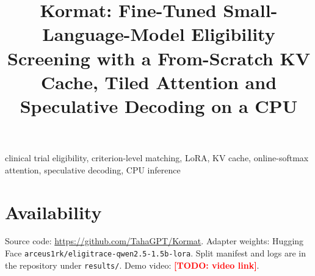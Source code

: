 \documentclass[conference]{IEEEtran}
\newcommand{\todo}[1]{\textcolor{red}{\textbf{[TODO: #1]}}}
\begin{document}
\title{Kormat: Fine-Tuned Small-Language-Model Eligibility Screening with a From-Scratch KV Cache, Tiled Attention and Speculative Decoding on a CPU}

\author{
}

\maketitle

\begin{abstract}

\end{abstract}

\begin{IEEEkeywords}
clinical trial eligibility, criterion-level matching, LoRA, KV cache, online-softmax attention, speculative decoding, CPU inference
\end{IEEEkeywords}









\section*{Availability}
Source code: \url{https://github.com/TahaGPT/Kormat}. Adapter weights: Hugging Face \texttt{arceus1rk/eligitrace-qwen2.5-1.5b-lora}. Split manifest and logs are in the repository under \texttt{results/}. Demo video: \todo{video link}.




\appendices

\end{document}
